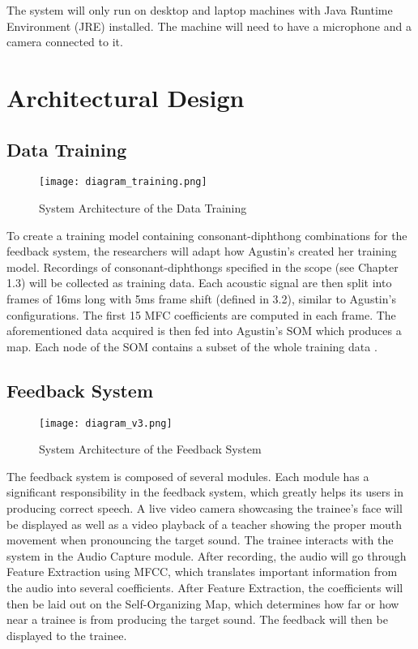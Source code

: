 The system will only run on desktop and laptop machines with Java Runtime Environment (JRE) installed. The machine will need to have a microphone and a camera connected to it.

\pagebreak

\section{Architectural Design}

\subsection{Data Training}

\begin{figure}[h]
    \centering
    \texttt{[image: diagram\_training.png]}
    \caption{System Architecture of the Data Training}
    \label{fig:architecture-training}
\end{figure}

To create a training model containing consonant-diphthong combinations for the feedback system, the researchers will adapt how Agustin's \citeyear{agustin:2014:SOM} created her training model. Recordings of consonant-diphthongs specified in the scope (see Chapter 1.3) will be collected as training data. Each acoustic signal are then split into frames of 16ms long with 5ms frame shift (defined in 3.2), similar to Agustin's configurations. The first 15 MFC coefficients are computed in each frame. The aforementioned data acquired is then fed into Agustin's SOM which produces a map. Each node of the SOM contains a subset of the whole training data \cite{agustin:2014:SOM}.

\subsection{Feedback System}

\begin{figure}[h]
    \centering
    \texttt{[image: diagram\_v3.png]}
    \caption{System Architecture of the Feedback System}
    \label{fig:architecture}
\end{figure}

The feedback system is composed of several modules. Each module has a significant responsibility in the feedback system, which greatly helps its users in producing correct speech. A live video camera showcasing the trainee's face will be displayed as well as a video playback of a teacher showing the proper mouth movement when pronouncing the target sound. The trainee interacts with the system in the Audio Capture module. After recording, the audio will go through Feature Extraction using MFCC, which translates important information from the audio into several coefficients. After Feature Extraction, the coefficients will then be laid out on the Self-Organizing Map, which determines how far or how near a trainee is from producing the target sound. The feedback will then be displayed to the trainee.

